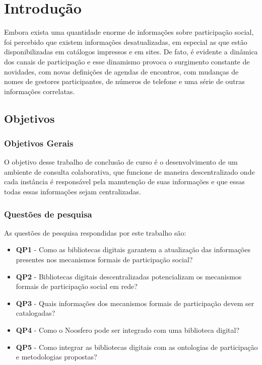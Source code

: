 \chapter{Introdução}


Embora exista uma quantidade enorme de informações sobre participação social, foi percebido que existem informações desatualizadas, em especial as que estão disponibilizadas em catálogos impressos e em sites. De fato, é evidente a dinâmica dos canais de participação e esse dinamismo provoca o surgimento constante de novidades, com novas definições de agendas de encontros, com mudanças de nomes de gestores participantes, de números de telefone e uma série de outras informações correlatas. 

\section{Objetivos}

\subsection{Objetivos Gerais}

O objetivo desse trabalho de conclusão de curso é o desenvolvimento de um ambiente de consulta colaborativa, que funcione de maneira descentralizado onde cada instância é responsável pela manutenção de suas informações e que essas todas essas informações sejam centralizadas. 

\subsection{Questões de pesquisa}

As questões de pesquisa respondidas por este trabalho são:

\begin{itemize}
\item \textbf{QP1} - Como as bibliotecas digitais garantem a atualização das informações presentes nos mecanismos formais de participação social?
\item \textbf{QP2} - Bibliotecas digitais descentralizadas potencializam os mecanismos formais de participação social em rede?
\item \textbf{QP3} - Quais informações dos mecanismos formais de participação devem ser catalogadas?
\item \textbf{QP4} - Como o Noosfero pode ser integrado com uma biblioteca digital?
\item \textbf{QP5} - Como integrar as bibliotecas digitais com as ontologias de participação e metodologias propostas?
\end{itemize} 

